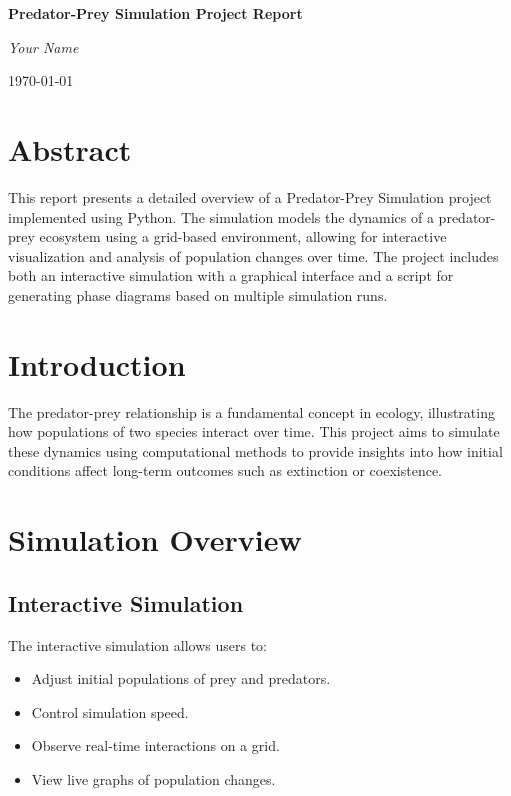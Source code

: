 \documentclass[12pt]{article}
\begin{document}
\begin{titlepage}
    \centering
    \vspace*{2cm}
    {\huge\bfseries Predator-Prey Simulation Project Report\par}
    \vspace{1.5cm}
    {\Large\itshape Your Name\par}
    \vfill
    {\large \today\par}
\end{titlepage}

\tableofcontents
\newpage

\section*{Abstract}
This report presents a detailed overview of a Predator-Prey Simulation project implemented using Python. The simulation models the dynamics of a predator-prey ecosystem using a grid-based environment, allowing for interactive visualization and analysis of population changes over time. The project includes both an interactive simulation with a graphical interface and a script for generating phase diagrams based on multiple simulation runs.

\section{Introduction}
The predator-prey relationship is a fundamental concept in ecology, illustrating how populations of two species interact over time. This project aims to simulate these dynamics using computational methods to provide insights into how initial conditions affect long-term outcomes such as extinction or coexistence.

\section{Simulation Overview}

\subsection{Interactive Simulation}
The interactive simulation allows users to:

\begin{itemize}
    \item Adjust initial populations of prey and predators.
    \item Control simulation speed.
    \item Observe real-time interactions on a grid.
    \item View live graphs of population changes.
\end{itemize}
\end{document}
